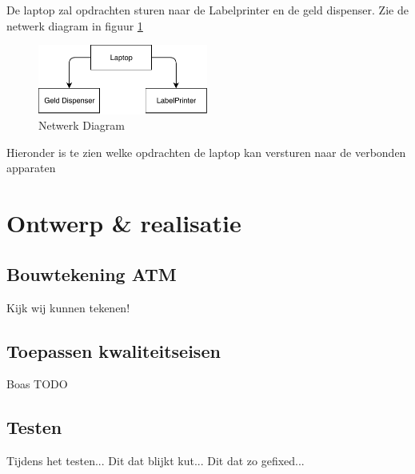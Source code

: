 \documentclass{article}
\begin{document}
De laptop zal opdrachten sturen naar de Labelprinter en de geld dispenser.
Zie de netwerk diagram in figuur \ref{fig: Netwerk Diagram}

\begin{figure}[!h]
        \centering
        \includegraphics[height=0.9in]{netwerk_diagram.pdf}
        \caption{Netwerk Diagram}
        \label{fig: Netwerk Diagram}
\end{figure}

Hieronder is te zien welke opdrachten de laptop kan versturen naar de verbonden apparaten 


\section{Ontwerp \& realisatie}

\subsection{Bouwtekening ATM}

Kijk wij kunnen tekenen!

\subsection{Toepassen kwaliteitseisen}

Boas TODO

\subsection{Testen}

Tijdens het testen...
Dit dat blijkt kut...
Dit dat zo gefixed...
\end{document}
